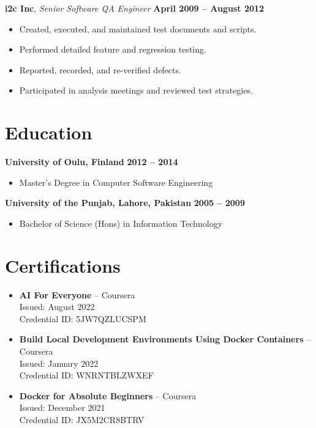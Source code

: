 \documentclass[12pt]{article}
\begin{document}
\textbf{i2c Inc}, \textit{Senior Software QA Engineer} \hfill \textbf{April 2009 – August 2012}
\begin{itemize}[leftmargin=1.5em]
    \item Created, executed, and maintained test documents and scripts.
    \item Performed detailed feature and regression testing.
    \item Reported, recorded, and re-verified defects.
    \item Participated in analysis meetings and reviewed test strategies.
\end{itemize}

\section*{Education}

\textbf{University of Oulu, Finland} \hfill \textbf{2012 – 2014}
\begin{itemize}[leftmargin=1.5em]
    \item Master's Degree in Computer Software Engineering
\end{itemize}

\textbf{University of the Punjab, Lahore, Pakistan} \hfill \textbf{2005 – 2009}
\begin{itemize}[leftmargin=1.5em]
    \item Bachelor of Science (Hons) in Information Technology
\end{itemize}

\section*{Certifications}

\begin{itemize}[leftmargin=1.5em]
    \item \textbf{AI For Everyone} -- Coursera \\
    Issued: August 2022 \\
    Credential ID: 5JW7QZLUCSPM
    \item \textbf{Build Local Development Environments Using Docker Containers} -- Coursera \\
    Issued: January 2022 \\
    Credential ID: WNRNTBLZWXEF
    \item \textbf{Docker for Absolute Beginners} -- Coursera \\
    Issued: December 2021 \\
    Credential ID: JX5M2CR8BTRV
\end{itemize}
\end{document}
